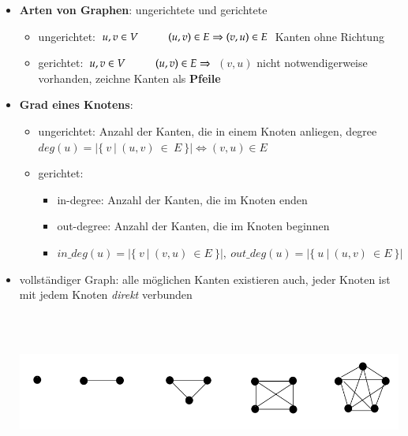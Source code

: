 \begin{itemize}
    \item \textbf{Arten von Graphen}: ungerichtete und gerichtete
    \begin{itemize}
        \item ungerichtet: $u, v \in V \hspace*{1cm} (u,v) \in E \Rightarrow (v, u) \in E$ Kanten ohne Richtung
        \item gerichtet: $u, v \in V \hspace*{1cm} (u,v) \in E \Rightarrow$ $(v, u)$ nicht notwendigerweise vorhanden, zeichne Kanten als \textbf{Pfeile}
        \end{itemize}
        \item \textbf{Grad eines Knotens}:
        \begin{itemize}
        \item ungerichtet: Anzahl der Kanten, die in einem Knoten anliegen, \glqq degree\grqq \\
        $deg(u) = | \{ \ v\  | \ (u,v)\  \in \ E\ \}| \Leftrightarrow (v,u) \in E$
        \item gerichtet:
        \begin{itemize}
            \item in-degree: Anzahl der Kanten, die im Knoten enden
            \item out-degree: Anzahl der Kanten, die im Knoten beginnen
            \item $in\_deg(u) = |\{ \  v \ |\  (v,u) \ \in E\ \}|, \ out\_deg(u) = |\{\  u\  |\  (u,v) \ \in E\ \}|$
        \end{itemize}
        \end{itemize}
            \item vollständiger Graph: alle möglichen Kanten existieren auch, jeder Knoten ist mit jedem Knoten \emph{direkt} verbunden\\
            \includegraphics[width=15cm,height=6cm,keepaspectratio]{./Pictures/vollstGraphen.png}\\

\end{itemize}
